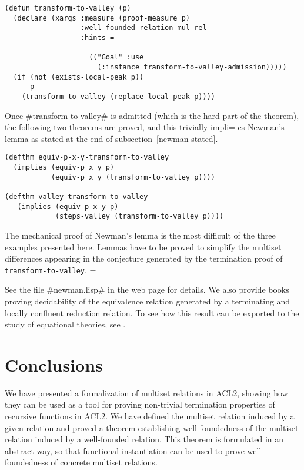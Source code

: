 \documentclass[11pt]{llncs}
\begin{document}
{\begin{verbatim}
(defun transform-to-valley (p)
  (declare (xargs :measure (proof-measure p)
                  :well-founded-relation mul-rel
                  :hints =

                    (("Goal" :use
                      (:instance transform-to-valley-admission)))))
  (if (not (exists-local-peak p))
      p
    (transform-to-valley (replace-local-peak p))))
\end{verbatim}

Once #transform-to-valley# is admitted (which is the hard part of the
theorem), the following two theorems are proved, and this trivially impli=
es
Newman's lemma as stated at the end of subsection~\ref{newman-stated}.

\begin{verbatim}
(defthm equiv-p-x-y-transform-to-valley
  (implies (equiv-p x y p)
           (equiv-p x y (transform-to-valley p))))

(defthm valley-transform-to-valley
   (implies (equiv-p x y p)
            (steps-valley (transform-to-valley p))))
\end{verbatim}

The mechanical proof of Newman's lemma is the most difficult  of the
three examples presented here. Lemmas have to be proved to simplify the
multiset differences appearing in the conjecture generated by the
termination proof of {\tt trans\-form\--to\--va\-lley}. =

See the file #newman.lisp#
in the web page for details. We also provide books proving decidability
of the equivalence relation generated by a terminating and locally
confluent reduction relation. To see how this result can be exported to
the study of equational theories, see \cite{RR2}.    =


\section{Conclusions}

We have presented a formalization of multiset relations in ACL2, showing
how they can be used as a tool for proving non-trivial termination
properties of recursive functions in ACL2. We have defined the multiset
relation induced by a given relation and proved a theorem establishing
well-foundedness of the multiset relation induced by a well-founded
relation. This theorem is formulated in an abstract way, so that
functional instantiation can be used to prove well-foundedness of
concrete multiset relations.

}
\end{document}
